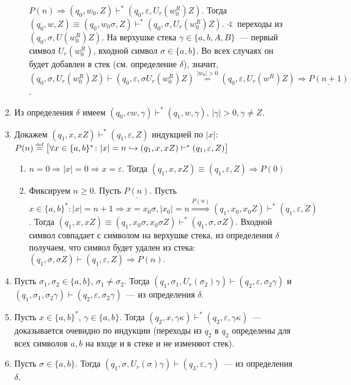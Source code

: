 \documentclass[a4paper]{article}
\def\eqdef{\overset{\mbox{\tiny def}}{=}}
\begin{document}
\begin{enumerate}[1.]
\begin{enumerate}
\begin{enumerate}
$P(n)\Rightarrow (q_0,w_0,Z)\vdash^*(q_0,\varepsilon,U_r(w_0^R)Z)$. Тогда $(q_0,w,Z)\equiv(q_0,w_0\sigma,Z)\vdash^*(q_0,\sigma,U_r(w_0^R)Z).$\newline
$\varangle$ переходы из $(q_0,\sigma,U(w_0^R)Z)$. На верхушке стека $\gamma\in\{a,b,A,B\}$~--- первый символ $U_r(w_0^R)$,\newline
входной символ $\sigma\in\{a,b\}$. Во всех случаях он будет добавлен в стек (см. определение $\delta$), значит, $(q_0,\sigma,U_r(w_0^R)Z)\vdash(q_0,\varepsilon,\sigma U_r(w_0^R)Z)\overset{|w_0|>0}{=}(q_0,\varepsilon,U_r(w^R)Z)\Rightarrow \underline{P(n+1)}$.
\end{enumerate}
\item \label{1.1c} Из определения $\delta$ имеем $(q_0,cw,\gamma)\vdash^*(q_1,w,\gamma)$, $|\gamma|>0,\gamma\neq Z$.
\item \label{1.1removing} Докажем $(q_1,x,xZ)\vdash^*(q_1,\varepsilon,Z)$ индукцией по $|x|$: $P(n)\eqdef\big[\forall x\in\{a,b\}^*\colon |x|=n\hookrightarrow (q_1,x,xZ)\vdash^*(q_1,\varepsilon,Z)\big]$\begin{enumerate}
\item $n=0\Rightarrow |x|=0\Rightarrow x=\varepsilon$. Тогда $(q_1,x,xZ)\equiv (q_1,\varepsilon,Z)\Rightarrow P(0)$
\item Фиксируем $n\geqslant 0$. Пусть $\underline{P(n)}$. Пусть $x\in\{a,b\}^*\colon |x|=n+1\Rightarrow x=x_0\sigma,|x_0|=n\overset{P(n)}{\Rightarrow} (q_1,x_0,x_0Z)\vdash^*(q_1,\varepsilon,Z)$. Тогда $(q_1,x,xZ)\equiv(q_1,x_0\sigma,x_0\sigma Z)\vdash^*(q_1,\sigma,\sigma Z)$. Входной символ совпадает с символом на верхушке стека, из определения $\delta$ получаем, что символ будет удален из стека: $(q_1,\sigma,\sigma Z)\vdash(q_1,\varepsilon,Z)\Rightarrow P(n)$.
\end{enumerate}
\item \label{1.1q1q2} Пусть $\sigma_1,\sigma_2\in\{a,b\}$, $\sigma_1\neq\sigma_2$. Тогда $(q_1,\sigma_1,U_r(\sigma_2)\gamma)\vdash(q_2,\varepsilon,\sigma_2\gamma)$ и $(q_1,\sigma_1,\sigma_2\gamma)\vdash(q_2,\varepsilon,\sigma_2\gamma)$~--- из определения $\delta$.
\item \label{1.1q2eat} Пусть $x\in\{a,b\}^*$, $\gamma\in\{a,b\}$. Тогда $(q_2,x,\gamma\kappa)\vdash^*(q_2,\varepsilon,\gamma\kappa)$~--- доказывается очевидно по индукции (переходы из $q_2$ в $q_2$ определены для всех символов $a,b$ на входе и в стеке и не изменяют стек).
\item \label{1.1q1q3} Пусть $\sigma\in\{a,b\}$. Тогда $(q_1,\sigma,U_r(\sigma)\gamma)\vdash(q_3,\varepsilon,\gamma)$~--- из определения $\delta$.

\end{enumerate}
\end{enumerate}
\end{document}
